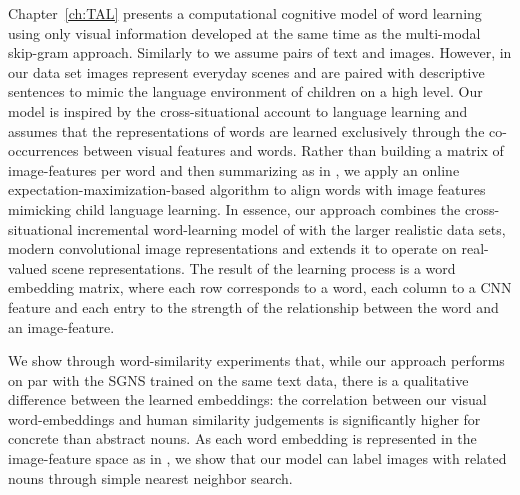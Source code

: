 Chapter~\ref{ch:TAL} presents a computational cognitive model of word learning using only
visual information developed at the same time as the multi-modal skip-gram approach.
Similarly to \cite{feng2010visual} we assume pairs of text and images. 
However, in our data set images represent everyday scenes and are paired with descriptive
sentences to mimic the language environment of children on a high level.
Our model is inspired by the cross-situational account to language
learning  and assumes that the representations of words are learned exclusively through the co-occurrences
between visual features and words. Rather than building a
matrix of image-features per word and then summarizing as in \cite{kiela2014learning},
we apply an online expectation-maximization-based 
algorithm \citep{dempster1977maximum} to align words with image features mimicking 
child language learning.
In essence, our approach combines the cross-situational incremental word-learning model
of \cite{fazly.etal.10csj} with the larger realistic data sets, modern convolutional image representations
and extends it to operate on real-valued scene representations.
The result of the learning process is a word embedding matrix,
where each row corresponds to a word, each column 
to a CNN feature and each entry to the strength
of the relationship between the word and an image-feature.

We show through word-similarity experiments that, while our approach performs on
par with the SGNS trained on the same text data, there is a qualitative difference between
the learned embeddings: the correlation between our visual word-embeddings 
and human similarity judgements is significantly higher for concrete than abstract nouns. 
As each word embedding  is represented in the
image-feature space as in \cite{kiela2014learning}, we show that our model can label images 
with related nouns through simple nearest neighbor search.

